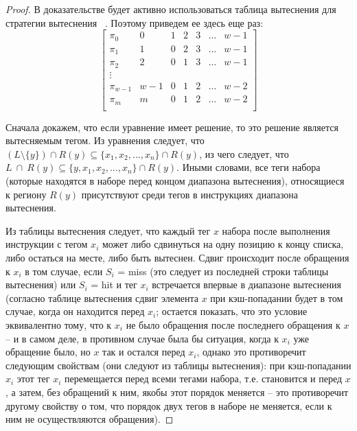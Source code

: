 \theoremtext{\ref{LRU_equation}}{\DiapazonLRU}
\begin{proof}
  В доказательстве будет активно использоваться таблица вытеснения
  для стратегии вытеснения \LRU~\cite{policy_tables}. Поэтому
  приведем ее здесь еще раз:
  $$
  \left[
    \begin{array}{c|cccccc}
      \pi_0 & 0 & 1 & 2 & 3 & \dots & w-1 \\
      \pi_1 & 1 & 0 & 2 & 3 & \dots & w-1 \\
      \pi_2 & 2 & 0 & 1 & 3 & \dots & w-1 \\
      \vdots &  &  &  & & & \\
      \pi_{w-1} & w-1 & 0 & 1 & 2 & \dots & w-2 \\
      \pi_m & m & 0 & 1 & 2 & \dots & w-2 \\
    \end{array}
  \right]
  $$

  Сначала докажем, что если уравнение имеет решение, то это решение
  является вытесняемым тегом. Из уравнения следует, что
  $(L\setminus\{y\}) \cap R(y) \subseteq \{x_1, x_2, ..., x_n\} \cap
  R(y)$, из чего следует, что $L~\cap~R(y) \subseteq \{y, x_1, x_2,
  ..., x_n\} \cap R(y)$. Иными словами, все теги набора (которые
  находятся в наборе перед концом диапазона вытеснения), относящиеся
  к региону $R(y)$ присутствуют
  среди тегов в инструкциях диапазона вытеснения.

  Из таблицы вытеснения следует, что каждый тег $x$ набора после
  выполнения инструкции с тегом $x_i$ может либо сдвинуться на одну позицию к
  концу списка, либо остаться на месте, либо быть вытеснен. Сдвиг
  происходит после обращения к $x_i$ в том случае, если $S_i$ = miss
  (это следует из последней строки таблицы вытеснения) или $S_i$ = hit
   и тег $x_i$ встречается впервые в диапазоне вытеснения (согласно таблице
  вытеснения сдвиг элемента $x$ при кэш-попадании будет в том случае, когда
  он находится перед $x_i$; остается показать, что это условие
  эквивалентно тому, что к $x_i$ не было обращения после последнего
  обращения к $x$ -- и в самом деле, в противном случае была бы
  ситуация, когда к $x_i$ уже обращение было, но $x$ так и остался
  перед $x_i$, однако это противоречит следующим свойствам (они
  следуют из таблицы вытеснения): при кэш-попадании $x_i$ этот тег
  $x_i$ перемещается перед всеми
  тегами набора, т.е. становится и перед $x$, а затем, без обращений к
  ним, якобы этот порядок меняется -- это противоречит другому
  свойству о том, что порядок двух тегов в наборе не меняется, если
  к ним не осуществляются обращения).


\end{proof}
